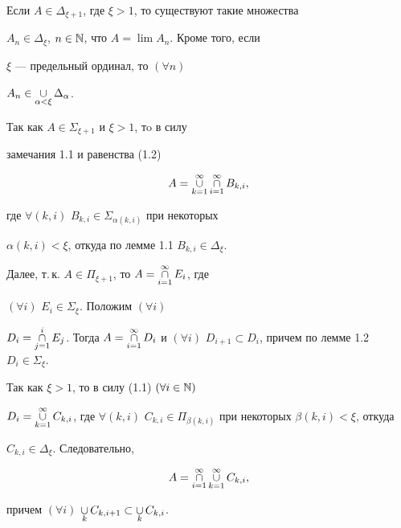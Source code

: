 \begin{lems} 


Если $A\in\Delta_{\xi+1}$, где $\xi>1$, то существуют такие множества 


$A_n\in\Delta_\xi$, $n\in\Bbb N$, что $A=\lim A_n$. Кроме того, если 


$\xi$ --- предельный ординал, то $(\forall n)$ 


$A_n\in\mathop{\cup}\limits_{\alpha<\xi}\Delta_\alpha$. 


\end{lems} 


 


\begin{pf} 


Так как $A\in\Sigma_{\xi+1}$ и $\xi>1$, тo в силу 


замечания 1.1 и равенства (1.2) 


$$ 


A=\mycup^\infty_{k=1}\mycap^\infty_{i=1}B_{k,i}, 


$$ 


где $\forall(k,i)$ $B_{k,i}\in\Sigma_{\alpha(k,i)}$ при некоторых 


$\alpha(k,i)<\xi$, откуда по лемме 1.1 $B_{k,i}\in\Delta_\xi$. 


 


Далее, т.\,к. $A\in\Pi_{\xi+1}$, то $A=\mathop{\cap}\limits^\infty_{i=1}E_i$, где 


$(\forall i)$ $E_i\in\Sigma_\xi$. Положим $(\forall i)$ 


$D_i=\mycap^i_{j=1}E_j$. Тогда $A=\mycap^\infty_{i=1}D_i$ и $(\forall 


i)$ $D_{i+1}\subset D_i$, причем по лемме 1.2 $D_i\in\Sigma_\xi$. 


 


Так как $\xi>1$, то в силу (1.1) $(\forall i\in\Bbb N)$ 


$D_i=\mycup^\infty_{k=1}C_{k,i}$, где $\forall(k,i)$ $C_{k,i}\in 


\Pi_{\beta(k,i)}$ при некоторых $\beta(k,i)<\xi$, откуда 


$C_{k,i}\in\Delta_\xi$. Следовательно, 


$$ 


A=\mycap^\infty_{i=1}\mycup^\infty_{k=1}C_{k,i}, 


$$ 


причем $(\forall i)$ $\mathop{\cup}\limits_k C_{k,i+1}\subset \mathop{\cup}\limits_k C_{k,i}$. 



\end{pf}
